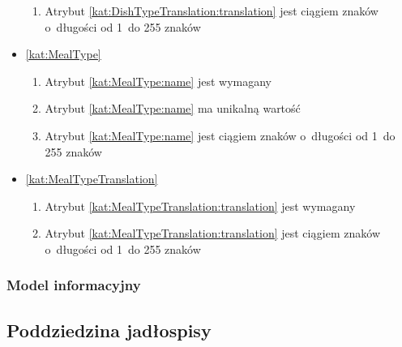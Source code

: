 \begin{itemize}[label={\textbf{Ograniczenia dla}}, wide, labelwidth=!, labelindent=0pt]
\begin{enumerate}[label={\textbf{OGR/2/\protect\twodigits{\arabic{enumi}}}}, wide, labelwidth=!, align=left, leftmargin=3cm, resume]
        \item Atrybut \ref{kat:DishTypeTranslation:translation} jest ciągiem znaków o~długości od 1~do 255 znaków
    \end{enumerate}

    \item\ref{kat:MealType}\mynobreakpar
    \begin{enumerate}[label={\textbf{OGR/2/\protect\twodigits{\arabic{enumi}}}}, wide, labelwidth=!, align=left, leftmargin=3cm, resume]
        \item Atrybut \ref{kat:MealType:name} jest wymagany

        \item Atrybut \ref{kat:MealType:name} ma unikalną wartość

        \item Atrybut \ref{kat:MealType:name} jest ciągiem znaków o~długości od 1~do 255 znaków
    \end{enumerate}

    \item\ref{kat:MealTypeTranslation}\mynobreakpar
    \begin{enumerate}[label={\textbf{OGR/2/\protect\twodigits{\arabic{enumi}}}}, wide, labelwidth=!, align=left, leftmargin=3cm, resume]
        \item Atrybut \ref{kat:MealTypeTranslation:translation} jest wymagany

        \item Atrybut \ref{kat:MealTypeTranslation:translation} jest ciągiem znaków o~długości od 1~do 255 znaków
    \end{enumerate}
\end{itemize}

\subsubsection{Model informacyjny}\label{subsubsec:database:recipes:domainModel}


\subsection{Poddziedzina jadłospisy}\label{subsec:database:mealplans}


